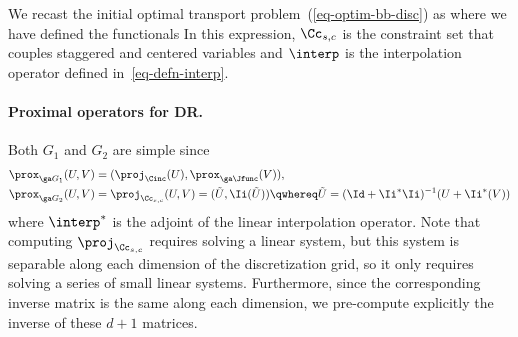 We recast the initial optimal transport problem~(\ref{eq-optim-bb-disc}) as
where we have defined the functionals
In this expression, $\Cc_{s,c}$ is the constraint set that couples staggered and centered variables
and $\interp$ is the interpolation operator defined in~\eqref{eq-defn-interp}.

\paragraph{Proximal operators for DR.}

Both $G_1$ and $G_2$ are simple since
\begin{align*}
	\prox_{\ga G_1}(U,V) &= ( \proj_{\Cinc}(U), \prox_{\ga \Jfunc}(V) ), \\
	\prox_{\ga G_2}(U,V) &= \proj_{\Cc_{s,c}}(U,V) = ( \tilde U, \Ii(\tilde U) )
	\qwhereq
	\tilde U = (\Id + \Ii^* \Ii)^{-1}( U + \Ii^*(V) )
\end{align*}
where $\interp^*$ is the adjoint of the linear interpolation operator. Note that computing $\proj_{\Cc_{s,c}}$ requires solving a linear system, but this system is separable along each dimension of the discretization grid, so it only requires solving a series of small linear systems. Furthermore, since the corresponding inverse matrix is the same along each dimension, we pre-compute explicitly the inverse of these $d+1$ matrices. 

